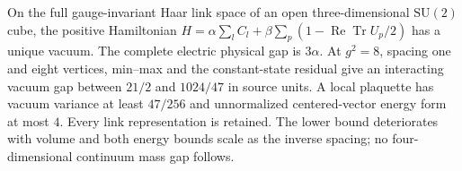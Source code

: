 On the full gauge-invariant Haar link space of an open three-dimensional
\(\mathrm{SU}(2)\) cube, the positive Hamiltonian
\(H=\alpha\sum_l C_l+\beta\sum_p(1-\operatorname{Re}\operatorname{Tr}U_p/2)\)
has a unique vacuum. The complete electric physical gap is \(3\alpha\).
At \(g^2=8\), spacing one and eight vertices, min--max and the constant-state
residual give an interacting vacuum gap between \(21/2\) and \(1024/47\)
in source units. A local plaquette has vacuum variance at least \(47/256\)
and unnormalized centered-vector energy form at most \(4\). Every link representation is
retained. The lower bound deteriorates with volume and both energy bounds
scale as the inverse spacing; no four-dimensional continuum mass gap follows.
